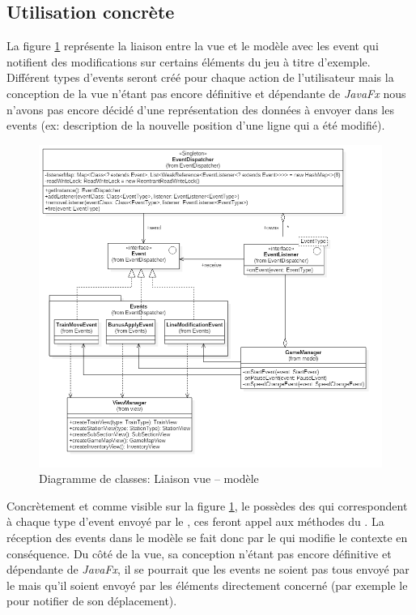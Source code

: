 \documentclass[report, backcover, french, nodocumentinfo]{upmethodology-document}
\begin{document}
			\subsection{Utilisation concrète}
				\p{}
					La figure \ref{fig:ViewModelLinkClassDiagram} représente la liaison entre la vue et le modèle avec les event qui notifient des modifications sur certains éléments du jeu à titre d'exemple. Différent types d'events seront créé pour chaque action de l'utilisateur mais la conception de la vue n'étant pas encore définitive et dépendante de \textit{JavaFx} nous n'avons pas encore décidé d'une représentation des données à envoyer dans les events (ex: description de la nouvelle position d'une ligne qui a été modifié).
					\begin{figure}[h!]
						\centering
						\includegraphics[width=\textwidth]{figures/ViewModelLinkClassDiagram}
						\caption{Diagramme de classes: Liaison vue -- modèle}
						\label{fig:ViewModelLinkClassDiagram}
					\end{figure}
				\p{}
					Concrètement et comme visible sur la figure \ref{fig:ViewModelLinkClassDiagram}, le  possèdes des  qui correspondent à chaque type d'event envoyé par le , ces  feront appel aux méthodes  du . La réception des events dans le modèle se fait donc par le  qui modifie le contexte en conséquence. Du côté de la vue, sa conception n'étant pas encore définitive et dépendante de \textit{JavaFx}, il se pourrait que les events ne soient pas tous envoyé par le  mais qu'il soient envoyé par les éléments directement concerné (par exemple le  pour notifier de son déplacement).
\end{document}
